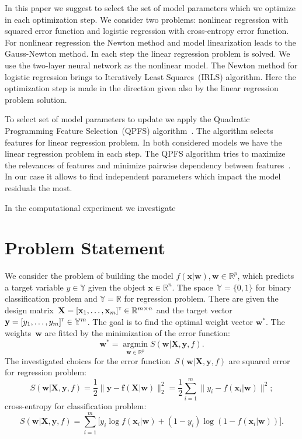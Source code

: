 \documentclass[a4paper,12pt]{article}
\theoremstyle{plain} %
\theoremstyle{definition} %
\theoremstyle{remark} %
\newcommand{\bw}{\mathbf{w}}
\newcommand{\by}{\mathbf{y}}
\newcommand{\bx}{\mathbf{x}}
\newcommand{\bbR}{\mathbb{R}}
\newcommand{\bbY}{\mathbb{Y}}
\newcommand{\bX}{\mathbf{X}}
\newcommand{\T}{{\text{\tiny\sffamily\upshape\mdseries T}}}
\newcommand{\argmin}{\mathop{\arg \min}\limits}
\begin{document}
	In this paper we suggest to select the set of model parameters which we optimize in each optimization step.
	We consider two problems: nonlinear regression with squared error function and logistic regression with cross-entropy error function.
	For nonlinear regression the Newton method and model linearization leads to the Gauss-Newton method. 
	In each step the linear regression problem is solved. 
	We use the two-layer neural network as the nonlinear model. 
	The Newton method for logistic regression brings to Iteratively Least Squares~(IRLS) algorithm. 
	Here the optimization step is made in the direction given also by the linear regression problem solution.
	
	To select set of model parameters to update we apply the Quadratic Programming Feature Selection~(QPFS) algorithm~\cite{katrutsa2017comprehensive,rodriguez2010qpfs}. The algorithm selects features for linear regression problem. In both considered models we have the linear regression problem in each step. The QPFS algorithm tries to maximize the relevances of features and minimize pairwise dependency between features~\cite{ding2005mrmr}. In our case it allows to find independent parameters which impact the model residuals the most.
	
	In the computational experiment we investigate 
	
		
	\section*{Problem Statement}

	We consider the problem of building the model $f( \bx | \bw), \bw \in \mathbb{R}^p$, which predicts a target variable $y \in \bbY$ given the object $\bx \in \bbR^{n}$. The space~$\bbY = \{0, 1\}$ for binary classification problem and $\bbY = \bbR$ for regression problem.
	There are given the design matrix~$\bX = [\bx_1, \dots, \bx_m]^{\T} \in \bbR^{m \times n}$ and the target vector~$\by = [y_1, \dots, y_m]^{\T} \in \bbY^{m}$. 
	The goal is to find the optimal weight vector $\bw^*$.
	The weights~$\bw$ are fitted by the minimization of the error function:
	\begin{equation}
	\bw^* = \argmin_{\bw \in \bbR^p} S(\bw | \bX, \by, f).
	\label{eq:error_function}
	\end{equation}
	The investigated choices for the error function~$S(\bw | \bX, \by, f)$ are
	squared error for regression problem: 
		\begin{equation}
			S(\bw | \bX, \by, f) = \frac 12 \| \by - \mathbf{f}(\bX | \bw) \|_2^2 = \frac 12 \sum_{i=1}^m \| y_i - f(\bx_i | \bw)\|^2;
			\label{eq:squared_error}
		\end{equation}
	cross-entropy for classification problem: 
		\begin{equation}
			S(\bw | \bX, \by, f) = \sum_{i=1}^m \bigl[y_i \log f (\bx_i | \bw) + (1-y_i) \log (1 - f (\bx_i | \bw))\bigr].
			\label{eq:log_loss}
		\end{equation}
	
\end{document}
